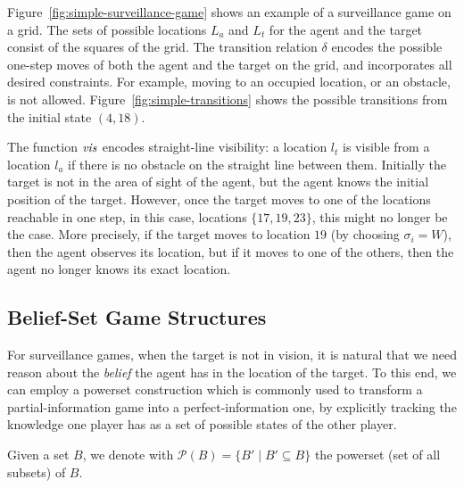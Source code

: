 \begin{example}\label{ex:simple-surveillance-game}
Figure~\ref{fig:simple-surveillance-game} shows an example of a surveillance game on a grid.  The sets of possible locations $L_a$ and $L_t$ for the agent and the target consist of the squares of the  grid. The transition relation $\delta$ encodes the possible one-step moves of both the agent and the target on the grid, and incorporates all desired constraints. For example, moving to an occupied location, or an obstacle, is not allowed. Figure~\ref{fig:simple-transitions} shows the possible transitions from the initial state $(4,18)$.

The function $\mathit{vis}$ encodes straight-line visibility: a location $l_t$ is visible from a location $l_a$ if there is no obstacle on the straight line between them. Initially the target is not in the area of sight of the agent, but the agent knows the initial position of the target. However, once the target moves to one of the locations reachable in one step, in this case, locations $\{17,19,23\}$, this might no longer be the case. More precisely, if the target moves to location $19$ (by choosing $\sigma_i = W$), then the agent observes its location, but if it moves to one of the others, then the agent no longer knows its exact location.
\end{example}



\subsection{Belief-Set Game Structures}

For surveillance games, when the target is not in vision, it is natural that we need reason about the \emph{belief} the agent has in the location of the target. 
 To this end, we can employ a powerset construction which is commonly used to transform a partial-information game into a perfect-information one, by explicitly tracking the knowledge one player has as a set of possible states of the other player.

Given a set $B$, we denote with $\mathcal{P}(B) = \{B' \mid B'\subseteq B\}$ the powerset (set of all subsets) of $B$.

